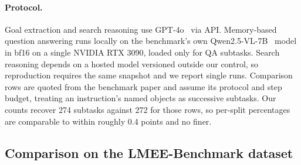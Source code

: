 \paragraph{Protocol.} Goal extraction and search reasoning use GPT-4o~\cite{openai2024gpt4o} via API. Memory-based question answering runs locally on the benchmark's own Qwen2.5-VL-7B~\cite{bai2025qwen25vl} model in bf16 on a single NVIDIA RTX 3090, loaded only for QA subtasks. Search reasoning depends on a hosted model versioned outside our control, so reproduction requires the same snapshot and we report single runs. Comparison rows are quoted from the benchmark paper and assume its protocol and step budget, treating an instruction's named objects as successive subtasks. Our counts recover 274 subtasks against 272 for those rows, so per-split percentages are comparable to within roughly 0.4 points and no finer.

\subsection{Comparison on the LMEE-Benchmark dataset}

